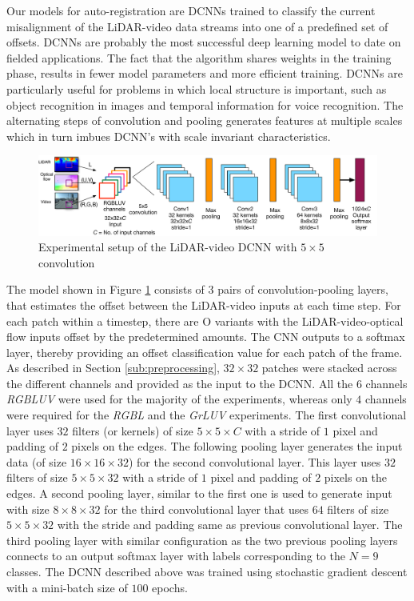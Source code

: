 \documentclass{article}
\begin{document}
Our models for auto-registration are DCNNs trained to classify the current misalignment of the LiDAR-video data streams into one of a predefined set of offsets. DCNNs are probably the most successful deep learning model to date on fielded applications. The fact that the algorithm shares weights in the training phase, results in fewer model parameters and more efficient training. DCNNs are particularly useful for problems in which local structure is important, such as object recognition in images and temporal information for voice recognition. The alternating steps of convolution and pooling generates features at multiple scales which in turn imbues DCNN's with scale invariant characteristics.

\begin{figure}[htbp]
    \centering
        \includegraphics[scale=0.42]{Figures/lidar_dcnn_setup2.pdf}
    \caption{Experimental setup of the LiDAR-video DCNN with $5\times5$ convolution}
    \label{fig:Figures_lidar_dcnn_setup1}
\end{figure}

The model shown in Figure \ref{fig:Figures_lidar_dcnn_setup1} consists of 3 pairs of convolution-pooling layers, that estimates the offset between the LiDAR-video inputs at each time step. For each patch within a timestep, there are O variants with the LiDAR-video-optical flow inputs offset by the predetermined amounts. The CNN outputs to a softmax layer, thereby providing an offset classification value for each patch of the frame. As described in Section \ref{sub:preprocessing}, $32\times32$ patches were stacked across the different channels and provided as the input to the DCNN. All the $6$ channels \emph{RGBLUV} were used for the majority of the experiments, whereas only $4$ channels were required for the \emph{RGBL} and the \emph{GrLUV} experiments. The first convolutional layer uses $32$ filters (or kernels) of size $5 \times 5 \times \mathit{C} $ with a stride of $1$ pixel and padding of $2$ pixels on the edges. The following pooling layer generates the input data (of size $16 \times 16 \times 32$) for the second convolutional layer. This layer uses $32$ filters of size $5 \times 5 \times 32$ with a stride of $1$ pixel and padding of $2$ pixels on the edges. A second pooling layer, similar to the first one is used to generate input with size $8 \times 8 \times 32$ for the third convolutional layer that uses $64$ filters of size $5 \times 5 \times 32$ with the stride and padding same as previous convolutional layer. The third pooling layer with similar configuration as the two previous pooling layers connects to an output softmax layer with labels corresponding to the $N=9$ classes. The DCNN described above was trained using stochastic gradient descent with a mini-batch size of $100$ epochs.
\end{document}
